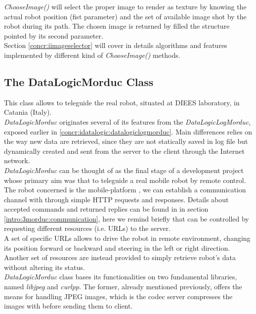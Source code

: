 \textit{ChooseImage()} will select the proper image to render as texture
by knowing the actual robot position (fist parameter) and the set of available
image shot by the robot during its path. The chosen image is returned by filled
the structure pointed by its second parameter.
\\
Section \ref{concr:iimageselector} will cover in details algorithms and
features implemented by different kind of \textit{ChooseImage()} methods.

\subsection{The DataLogicMorduc Class}
\label{concr:idatalogic:datalogicmorduc}

This class allows \framework{} to teleguide the real \morduc{}
robot, situated at DIEES laboratory, in Catania (Italy).
\\
\textit{DataLogicMorduc} originates several of its features 
from the \textit{DataLogicLogMorduc}, exposed earlier in
\ref{concr:idatalogic:datalogiclogmorduc}. Main differences
relies on the way new data are retrieved, since they are not
statically saved in log file but dynamically created and sent
from the server to the client through the Internet network.
\\
\textit{DataLogicMorduc} can be thought of as the final
stage of a development project whose primary aim was that
to teleguide a real mobile robot by remote control.
\\
The
robot concerned is the mobile-platform \morduc{}, we can
establish a communication channel with through simple
HTTP requests and responses. Details about accepted
commands and returned replies can be found in 
in section \ref{intro:3morduc:communication}, here we
remind briefly that \morduc{} can be controlled
by requesting different resources (i.e. URLs) to the server.
\\
A set of specific URLs allows to drive the robot in remote
environment, changing its position forward or backward and
steering in the left or right direction. Another set
of resources are instead provided to simply retrieve robot's
data without altering its status.
\\
\textit{DataLogicMorduc} class bases its functionalities
on two fundamental libraries, named \textit{libjpeg} and
\textit{curlpp}. The former, already mentioned previously,
offers the means for handling JPEG images, which is the codec
server compresses the images with before sending them to
client.
\\
